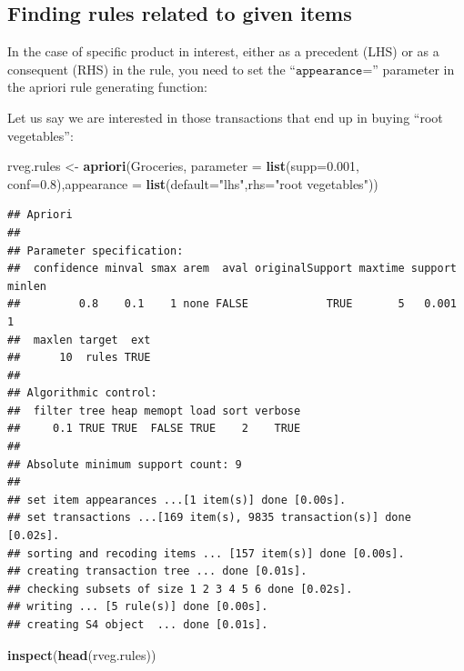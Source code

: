 \documentclass[
]{book}
\newenvironment{Shaded}{\begin{snugshade}}{\end{snugshade}}
\newcommand{\DataTypeTok}[1]{\textcolor[rgb]{0.13,0.29,0.53}{#1}}
\newcommand{\FloatTok}[1]{\textcolor[rgb]{0.00,0.00,0.81}{#1}}
\newcommand{\KeywordTok}[1]{\textcolor[rgb]{0.13,0.29,0.53}{\textbf{#1}}}
\newcommand{\NormalTok}[1]{#1}
\newcommand{\StringTok}[1]{\textcolor[rgb]{0.31,0.60,0.02}{#1}}
\begin{document}
\hypertarget{finding-rules-related-to-given-items}{%
\subsection{Finding rules related to given items}\label{finding-rules-related-to-given-items}}

In the case of specific product in interest, either as a precedent (LHS) or as a consequent (RHS) in the rule, you need to set the ``\(\texttt{appearance=}\)'' parameter in the apriori rule generating function:

Let us say we are interested in those transactions that end up in buying ``root vegetables'':

\begin{Shaded}
\begin{Highlighting}[]
\NormalTok{rveg.rules <-}\StringTok{ }\KeywordTok{apriori}\NormalTok{(Groceries, }\DataTypeTok{parameter =} \KeywordTok{list}\NormalTok{(}\DataTypeTok{supp=}\FloatTok{0.001}\NormalTok{, }\DataTypeTok{conf=}\FloatTok{0.8}\NormalTok{),}\DataTypeTok{appearance =} \KeywordTok{list}\NormalTok{(}\DataTypeTok{default=}\StringTok{"lhs"}\NormalTok{,}\DataTypeTok{rhs=}\StringTok{"root vegetables"}\NormalTok{))}
\end{Highlighting}
\end{Shaded}

\begin{verbatim}
## Apriori
## 
## Parameter specification:
##  confidence minval smax arem  aval originalSupport maxtime support minlen
##         0.8    0.1    1 none FALSE            TRUE       5   0.001      1
##  maxlen target  ext
##      10  rules TRUE
## 
## Algorithmic control:
##  filter tree heap memopt load sort verbose
##     0.1 TRUE TRUE  FALSE TRUE    2    TRUE
## 
## Absolute minimum support count: 9 
## 
## set item appearances ...[1 item(s)] done [0.00s].
## set transactions ...[169 item(s), 9835 transaction(s)] done [0.02s].
## sorting and recoding items ... [157 item(s)] done [0.00s].
## creating transaction tree ... done [0.01s].
## checking subsets of size 1 2 3 4 5 6 done [0.02s].
## writing ... [5 rule(s)] done [0.00s].
## creating S4 object  ... done [0.01s].
\end{verbatim}

\begin{Shaded}
\begin{Highlighting}[]
\KeywordTok{inspect}\NormalTok{(}\KeywordTok{head}\NormalTok{(rveg.rules))}
\end{Highlighting}
\end{Shaded}
\end{document}
